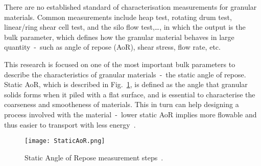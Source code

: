 There are no established standard of characterisation measurements for granular materials. Common measurements include heap test, rotating drum test, linear/ring shear cell test, and the silo flow test,\ldots, in which the output is the bulk parameter, which defines how the granular material behaves in large quantity~-~such as angle of repose (AoR), shear stress, flow rate, etc. 

This research is focused on one of the most important bulk parameters to describe the characteristics of granular materials~-~the static angle of repose. Static AoR, which is described in Fig.~\ref{fig:StaticAoR}, is defined as the angle that granular solids forms when it piled with a flat surface, and is essential to characterise the coarseness and smootheness of materials. This in turn can help designing a process involved with the material~-~lower static AoR implies more flowable and thus easier to transport with less energy~\cite{TEFERRA201945}. 


\begin{figure}[t]
    \centering
    \texttt{[image: StaticAoR.png]}
    \caption{Static Angle of Repose measurement steps~\cite{Rackl:2018te}.}\label{fig:StaticAoR}
\end{figure}



